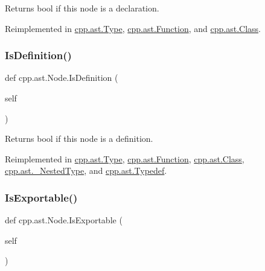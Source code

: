 \begin{DoxyVerb}Returns bool if this node is a declaration.\end{DoxyVerb}
 

Reimplemented in \mbox{\hyperlink{classcpp_1_1ast_1_1_type_a590071a2bce7ea5140d7eb86c90f63bf}{cpp.\+ast.\+Type}}, \mbox{\hyperlink{classcpp_1_1ast_1_1_function_ab9120d9a774eb5860d220b3bcdcaa87e}{cpp.\+ast.\+Function}}, and \mbox{\hyperlink{classcpp_1_1ast_1_1_class_a4758bfb7c00410575932974e1ed8b7da}{cpp.\+ast.\+Class}}.

\mbox{\label{classcpp_1_1ast_1_1_node_a684ee9a357168e7e07a24fc6812f66e6}} 
\subsubsection{\texorpdfstring{IsDefinition()}{IsDefinition()}}
{\footnotesize\ttfamily def cpp.\+ast.\+Node.\+Is\+Definition (\begin{DoxyParamCaption}\item[{}]{self }\end{DoxyParamCaption})}

\begin{DoxyVerb}Returns bool if this node is a definition.\end{DoxyVerb}
 

Reimplemented in \mbox{\hyperlink{classcpp_1_1ast_1_1_type_aedff25dc3736e83388742e55fe29159b}{cpp.\+ast.\+Type}}, \mbox{\hyperlink{classcpp_1_1ast_1_1_function_ad5d96144bd8418ac72332bffb21ea86f}{cpp.\+ast.\+Function}}, \mbox{\hyperlink{classcpp_1_1ast_1_1_class_ae6d2356f835d06d5109d9e4609d86780}{cpp.\+ast.\+Class}}, \mbox{\hyperlink{classcpp_1_1ast_1_1___nested_type_a9f160999863f39c9032f60b014e213d5}{cpp.\+ast.\+\_\+\+Nested\+Type}}, and \mbox{\hyperlink{classcpp_1_1ast_1_1_typedef_a103bf391e665884bfbfd20fc5e6d1a19}{cpp.\+ast.\+Typedef}}.

\mbox{\label{classcpp_1_1ast_1_1_node_a313273874ccf578485006d4000128234}} 
\subsubsection{\texorpdfstring{IsExportable()}{IsExportable()}}
{\footnotesize\ttfamily def cpp.\+ast.\+Node.\+Is\+Exportable (\begin{DoxyParamCaption}\item[{}]{self }\end{DoxyParamCaption})}

